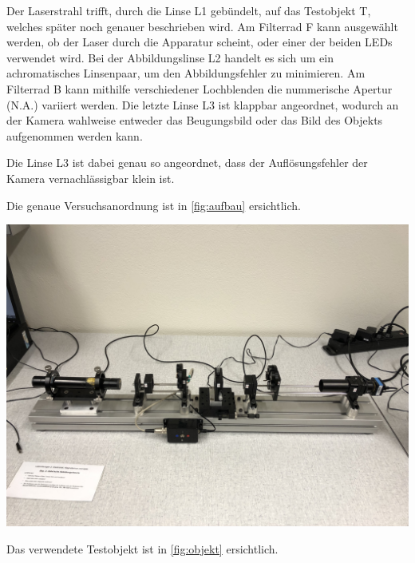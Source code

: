 \documentclass[11pt,ngerman]{scrartcl}
\begin{document}
\noindent Der Laserstrahl trifft, durch die Linse L1 gebündelt, auf das Testobjekt T, welches später noch genauer beschrieben wird. Am Filterrad F kann ausgewählt werden, ob der Laser durch die Apparatur scheint, oder einer der beiden LEDs verwendet wird. Bei der Abbildungslinse L2 handelt es sich um ein achromatisches Linsenpaar, um den Abbildungsfehler zu minimieren. Am Filterrad B kann mithilfe verschiedener Lochblenden die nummerische Apertur (N.A.) variiert werden. Die letzte Linse L3 ist klappbar angeordnet, wodurch an der Kamera wahlweise entweder das Beugungsbild oder das Bild des Objekts aufgenommen werden kann.

\noindent Die Linse L3 ist dabei genau so angeordnet, dass der Auflösungsfehler der Kamera vernachlässigbar klein ist.

\newpage

\noindent Die genaue Versuchsanordnung ist in \autoref{fig:aufbau} ersichtlich.

\begin{center}
	\begin{minipage}[t]{0.7\textwidth}
		\includegraphics[width=\textwidth]{abbe}
		\label{fig:aufbau}
	\end{minipage}
\end{center}

\noindent Das verwendete Testobjekt ist in \autoref{fig:objekt} ersichtlich.
\end{document}
